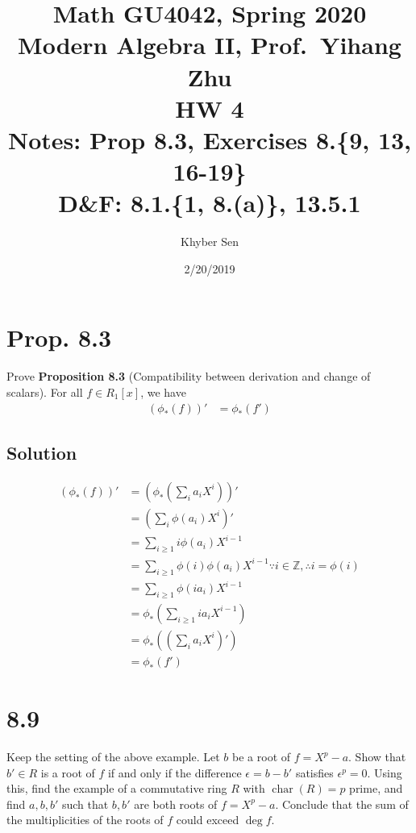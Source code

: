 \documentclass[fleqn]{article}
\title{
Math GU4042, Spring 2020 \\
Modern Algebra II, Prof.\ Yihang Zhu \\
HW 4 \\
Notes: Prop 8.3, Exercises 8.\{9, 13, 16-19\} \\
D\&F: 8.1.\{1, 8.(a)\}, 13.5.1
}
\author{Khyber Sen}
\date{2/20/2019}
\DeclareMathOperator{\Char}{char}
\begin{document}
    
    \maketitle
    
    \section{Prop. 8.3}
    Prove \textbf{Proposition 8.3} (Compatibility between derivation and change of scalars).  For all $f \in R_1[x]$, we have
    \begin{align}
        (\phi_*(f))' &= \phi_*\left(f'\right)
    \end{align}
        
        \subsection{Solution}
        \begin{align}
            (\phi_*(f))' &= \left(\phi_*\left(\sum\limits_i a_i X^i\right)\right)' \\
                &= \left(\sum\limits_i \phi(a_i) X^i\right)' \\
                &= \sum\limits_{i \geq 1} i \phi(a_i) X^{i - 1} \\
                &= \sum\limits_{i \geq 1} \phi(i) \phi(a_i) X^{i - 1} \because{} i \in \mathbb{Z}, \therefore{} i = \phi(i) \\
                &= \sum\limits_{i \geq 1} \phi(i a_i) X^{i - 1} \\
                &= \phi_*\left(\sum\limits_{i \geq 1} i a_i X^{i - 1}\right) \\
                &= \phi_*\left(\left(\sum\limits_i a_i X^i\right)'\right) \\
                &= \phi_*\left(f'\right)
        \end{align}
    
    \section{8.9}
    Keep the setting of the above example.  Let $b$ be a root of $f = X^p - a$.  Show that $b' \in R$ is a root of $f$ if and only if the difference $\epsilon = b - b'$ satisfies $\epsilon^p = 0$.  Using this, find the example of a commutative ring $R$ with $\Char(R) = p$ prime, and find $a, b, b'$ such that $b, b'$ are both roots of $f = X^p - a$.  Conclude that the sum of the multiplicities of the roots of $f$ could exceed $\deg f$.
        
\end{document}
